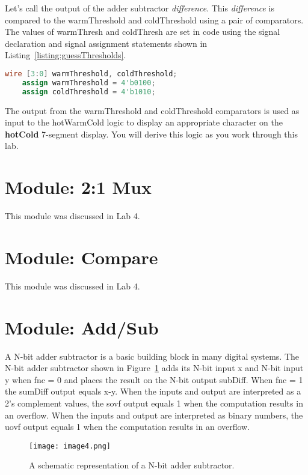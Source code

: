 Let's call the output of the adder subtractor \emph{difference}. This
\emph{difference} is compared to the warmThreshold and coldThreshold
using a pair of comparators. The values of warmThresh and coldThresh are
set in code using the signal declaration and signal assignment
statements shown in Listing~\ref{listing:guessThresholds}.

\begin{lstlisting}[language=Verilog,
 caption={The signal declaration and assignment for guess thresholds.},
 label={listing:guessThresholds},
 frame=single]
    wire [3:0] warmThreshold, coldThreshold; 
    assign warmThreshold = 4'b0100;		
    assign coldThreshold = 4'b1010;
\end{lstlisting}

The output from the warmThreshold and coldThreshold comparators is used
as input to the hotWarmCold logic to display an appropriate character on
the \textbf{hotCold} 7-segment display. You will derive this logic as
you work through this lab.

\section{Module: 2:1 Mux}
This module was discussed in Lab 4.



\section{Module: Compare}
This module was discussed in Lab 4.


\section{Module: Add/Sub }

A N-bit adder subtractor is a basic building block in many digital
systems. The N-bit adder subtractor shown in Figure~\ref{fig:adderSubSymbol} adds 
its N-bit
input x and N-bit input y when fnc = 0 and places the result on the
N-bit output subDiff. When fnc = 1 the sumDiff output equals x-y. When
the inputs and output are interpreted as a 2's complement values, the
sovf output equals 1 when the computation results in an overflow. When
the inputs and output are interpreted as binary numbers, the uovf output
equals 1 when the computation results in an overflow.

\begin{figure}[ht]
\texttt{[image:  image4.png]}
\caption{A schematic representation of a N-bit adder subtractor.}
\label{fig:adderSubSymbol}
\end{figure}

